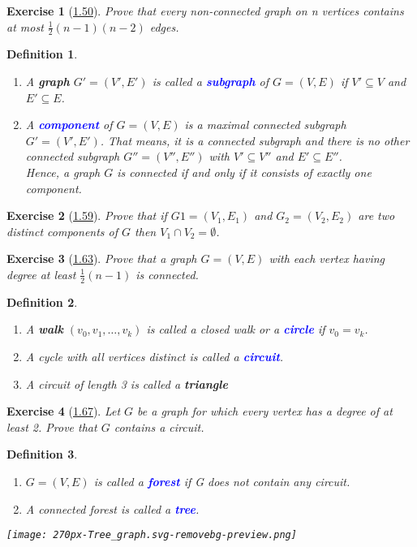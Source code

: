\documentclass[10pt]{report}
\numberwithin{dummy}{section}
\theoremstyle{ocrenumbox}
\newtheorem{definitionT}{Exercise}[]
\theoremstyle{grayman}
\newtheorem{definitionTTTT}{Definition}[]
\newenvironment{exo}{\begin{dBox}\begin{definitionT}}{\end{definitionT}\end{dBox}}
\newenvironment{voc}{\begin{vBox}\begin{definitionTTTT}}{\end{definitionTTTT}\end{vBox}}
\begin{document}
\begin{exo}[\hypertarget{exo150}{\hyperlink{so150}{1.50}}] Prove that every non-connected graph on n vertices contains at most $\frac{1}{2}(n - 1)(n - 2)$ edges.
\end{exo}
\begin{voc}{}{}\leavevmode
\begin{enumerate}
    \item A \textbf{graph}  $G' = (V', E')$ is called a \textbf{\textcolor{blue}{subgraph}} of $G = (V, E)$ if $V' \subseteq V$ and
$E' \subseteq E$. 
    \item A \textbf{\textcolor{blue}{component}} of $G = (V, E)$ is a maximal connected subgraph $G' = (V', E')$. That means, it is a connected subgraph and there is no other
connected subgraph $G'' = (V'', E'')$ with $V' \subseteq V''$ and $E' \subseteq E''$.\\
Hence, a graph $G$ is connected if and only if it consists of exactly one component.
    \end{enumerate}
\end{voc}

\newpage
\begin{exo}[\hypertarget{exo159}{\hyperlink{so159}{1.59}}] 
 Prove that if $ G1 = (V_1, E_1)$ and
$G_2 = (V_2, E_2)$ are two distinct components of $G$ then $V_1 \cap V_2 = \emptyset$.
\end{exo}
\begin{exo}[\hypertarget{exo163}{\hyperlink{so163}{1.63}}] 
Prove that a graph $G = (V, E)$ with each vertex having
degree at least $\frac{1}{2}(n - 1)$ is connected.
\end{exo}
\begin{voc}{}{}\leavevmode
\begin{enumerate}
    \item A \textbf{walk} $(v_0, v_1, \dots , v_k)$ is called a closed walk or a \textbf{\textcolor{blue}{circle}} if $v_0 = v_k$. \item A cycle with all vertices distinct is called a \textbf{\textcolor{blue}{circuit}}. 
    \item A circuit of length 3 is called a \textbf{triangle}
\end{enumerate}
\end{voc}

\begin{exo}[\hypertarget{exo167}{\hyperlink{so167}{1.67}}] 
Let $G$ be a graph for which every vertex has a degree of at
least 2. Prove that $G$ contains a circuit.
\end{exo} 
\begin{voc}{}{}\leavevmode
\begin{enumerate}
    \item $G = (V, E)$ is called a \textbf{\textcolor{blue}{forest}} if G does not contain any circuit. 
    \item A connected forest is called a \textbf{\textcolor{blue}{tree}}.
\end{enumerate}
\begin{center}
    \texttt{[image: 270px-Tree\_graph.svg-removebg-preview.png]}
    \end{center}
\end{voc}
\end{document}
